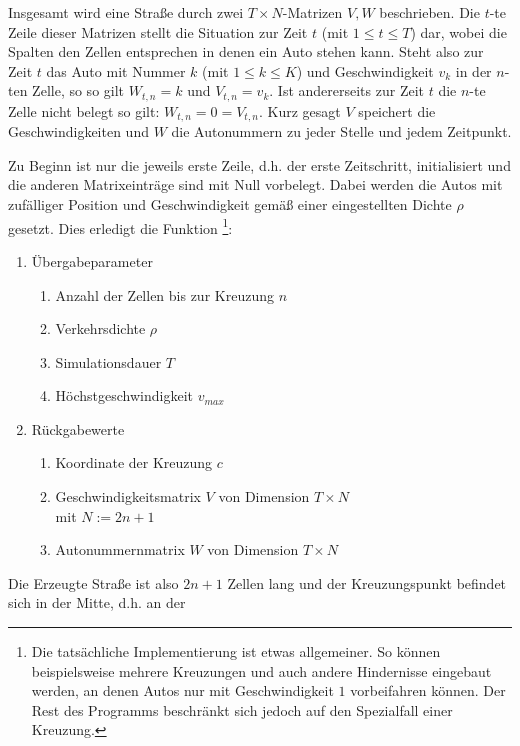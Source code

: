 Insgesamt wird eine Straße durch zwei \(T \times N\)-Matrizen \(V, W\) beschrieben.
Die \(t\)-te Zeile dieser Matrizen stellt die Situation zur Zeit \(t\) (mit \(1 \leq t \leq T\)) dar, 
wobei die Spalten den Zellen entsprechen in denen ein Auto stehen kann. 
Steht also zur Zeit \(t\) das Auto mit Nummer \(k\) (mit \(1 \leq k \leq K\)) und Geschwindigkeit \(v_k\) in der \(n\)-ten Zelle, 
so so gilt \( W_{t, n} = k\) und \(V_{t, n} = v_k\). 
Ist andererseits zur Zeit \(t\) die \(n\)-te Zelle nicht belegt so gilt: \(W_{t, n} = 0 = V_{t, n}\).
Kurz gesagt \(V\) speichert die Geschwindigkeiten und \(W\) die Autonummern zu jeder Stelle und jedem Zeitpunkt.

Zu Beginn ist nur die jeweils erste Zeile, d.h. der erste Zeitschritt, initialisiert und die anderen Matrixeinträge
sind mit Null vorbelegt. Dabei werden die Autos mit zufälliger Position und Geschwindigkeit gemäß
einer eingestellten Dichte \(\rho\) gesetzt. Dies erledigt die Funktion  \footnote{Die tatsächliche 
Implementierung ist etwas allgemeiner. So können beispielsweise mehrere Kreuzungen und auch andere
Hindernisse eingebaut werden, an denen Autos nur mit Geschwindigkeit \(1\) vorbeifahren können. Der Rest des Programms 
beschränkt sich jedoch auf den Spezialfall einer Kreuzung.}:
\begin{enumerate}
  \item Übergabeparameter
    \begin{enumerate}
      \item Anzahl der Zellen bis zur Kreuzung \(n\) 
      \item Verkehrsdichte \(\rho\)
      \item Simulationsdauer \(T\)
      \item Höchstgeschwindigkeit \(v_{max}\) 
    \end{enumerate}
  \item Rückgabewerte
    \begin{enumerate}
      \item Koordinate der Kreuzung \(c\) 
      \item Geschwindigkeitsmatrix \(V\) von Dimension \(T \times N\) \\ mit \(N := 2n+1\)
      \item Autonummernmatrix \(W\) von Dimension \(T \times N\) 
    \end{enumerate}
\end{enumerate}
Die Erzeugte Straße ist also \(2n+1\) Zellen lang und der Kreuzungspunkt befindet sich  in der Mitte, d.h. an der 
